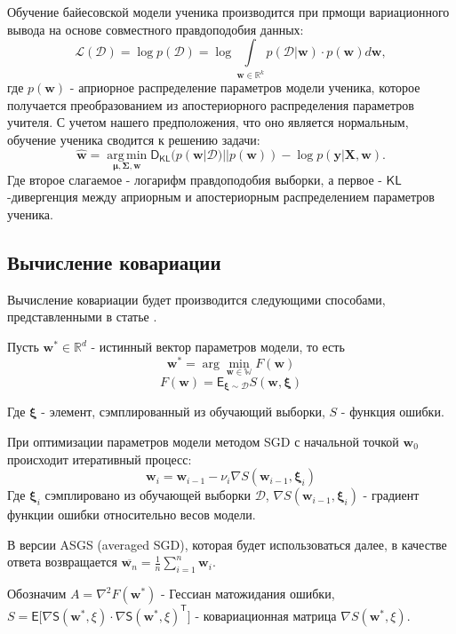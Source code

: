 \documentclass[12pt, twoside]{article}
\DeclareMathOperator*{\argmin}{arg\,min}
\begin{document}
Обучение байесовской модели ученика производится при прмощи вариационного вывода на основе совместного правдоподобия данных:
\[
\mathcal{L}(\mathcal{D}) = \log p(\mathcal{D}) = \log \int \limits_{\mathbf{w} \in \mathbb{R}^{k}}p(\mathcal{D}|\mathbf{w}) \cdot p(\mathbf{w}) d\mathbf{w},
\] где $p(\mathbf{w})$ - априорное распределение параметров модели ученика, которое получается преобразованием из апостериорного распределения параметров учителя. С учетом нашего предположения, что оно является нормальным, обучение ученика сводится к решению задачи:
\[
\mathbf{\widehat{w}} = \argmin \limits_{\mathbf{\mu}, \mathbf{\Sigma}, \mathbf{w}} \mathsf{D}_{\mathsf{KL}}(p(\mathbf{w}|\mathcal{D})||p(\mathbf{w})) - \log p(\mathbf{y}|\mathbf{X}, \mathbf{w}).
\] Где второе слагаемое - логарифм правдоподобия выборки, а первое - $\mathsf{KL}$-дивергенция между априорным и апостериорным распределением параметров ученика.


\subsection{Вычисление ковариации}
Вычисление ковариации будет производится следующими способами, представленными в статье \citep{chen2020statistical}.

Пусть $\mathbf{w}^* \in \mathbb{R}^d$ - истинный вектор параметров модели, то есть
$$
\mathbf{w}^* = \arg \min\limits_{\mathbf{w} \in \mathbb{W}} F(\mathbf{w})
$$
$$
F(\mathbf{w}) = \mathsf{E}_{\mathbf{\xi} \sim \mathcal{D}}S(\mathbf{w}, \mathbf{\xi})
$$

Где $\mathbf{\xi}$ - элемент, сэмплированный из обучающий выборки, $S$ - функция ошибки.

При оптимизации параметров модели методом SGD с начальной точкой $\mathbf{w}_0$ происходит итеративный процесс:
$$
\mathbf{w}_i = \mathbf{w}_{i-1} - \nu_i\nabla S(\mathbf{w}_{i-1}, \mathbf{\xi}_i)
$$
Где $\mathbf{\xi}_i$ сэмплировано из обучающей выборки $\mathcal{D}$, $\nabla S(\mathbf{w}_{i-1}, \mathbf{\xi}_i)$ - градиент функции ошибки относительно весов модели. 

В версии ASGS (averaged SGD), которая будет использоваться далее, в качестве ответа возвращается $\overline{\mathbf{w}_n} = \frac{1}{n}\sum\limits_{i=1}^n\mathbf{w}_i$.

Обозначим $A=\nabla^2F(\mathbf{w}^*)$ - Гессиан матожидания ошибки, $S=\mathsf{E\big[\nabla S(\mathbf{w}^*, \xi) \cdot \nabla S(\mathbf{w}^*, \xi)^{\mathsf{T}}\big]}$ - ковариационная матрица $\nabla S(\mathbf{w}^*, \xi)$.
\end{document}
